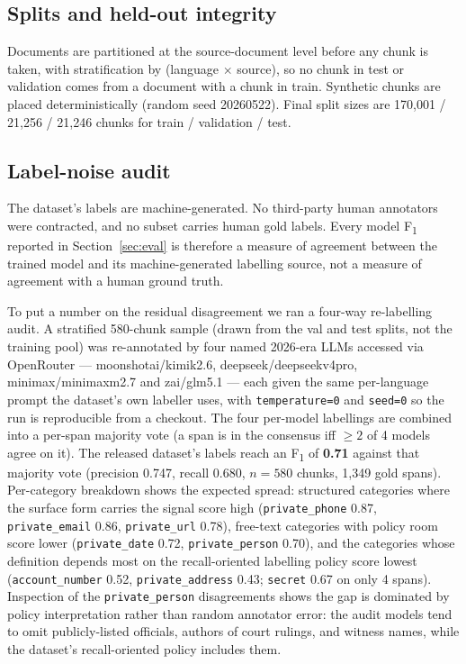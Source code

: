 \documentclass[sigconf,nonacm]{acmart}
\newcommand*{\Bhy}{\discretionary{-}{}{-}}%
\begin{document}
\subsection{Splits and held-out integrity}

Documents are partitioned at the source-document level before any
chunk is taken, with stratification by (language $\times$ source), so
no chunk in test or validation comes from a document with a chunk
in train. Synthetic chunks are placed deterministically (random seed
20260522). Final split sizes are 170{,}001 / 21{,}256 / 21{,}246
chunks for train / validation / test.

\subsection{Label-noise audit}
\label{sec:labelnoise}

The dataset's labels are machine-generated. No third-party human
annotators were contracted, and no subset carries human gold labels.
Every model F\textsubscript{1} reported in Section~\ref{sec:eval} is
therefore a measure of agreement between the trained model and its
machine-generated labelling source, not a measure of agreement with
a human ground truth.

To put a number on the residual disagreement we ran a four-way
re-labelling audit. A stratified 580-chunk sample (drawn from the
val and test splits, not the training pool) was re-annotated by
four named 2026-era LLMs accessed via OpenRouter ---
\textsf{moonshotai/kimi\Bhy k2.6}, \textsf{deepseek/deepseek\Bhy v4\Bhy pro},
\textsf{minimax/minimax\Bhy m2.7} and \textsf{z\Bhy ai/glm\Bhy 5.1} ---
each given the same per-language prompt the dataset's own labeller
uses, with \texttt{temperature=0} and \texttt{seed=0} so the run is
reproducible from a checkout. The four per-model labellings are
combined into a per-span majority vote (a span is in the consensus
iff ${\geq}2$ of 4 models agree on it). The released dataset's
labels reach an F\textsubscript{1} of \textbf{0.71} against that
majority vote (precision 0.747, recall 0.680, $n=580$ chunks,
1{,}349 gold spans). Per-category breakdown shows the expected
spread: structured categories where the surface form carries the
signal score high (\texttt{private\_phone} 0.87,
\texttt{private\_email} 0.86, \texttt{private\_url} 0.78),
free-text categories with policy room score lower
(\texttt{private\_date} 0.72, \texttt{private\_person} 0.70),
and the categories whose definition depends most on the
recall-oriented labelling policy score lowest
(\texttt{account\_number} 0.52, \texttt{private\_address} 0.43;
\texttt{secret} 0.67 on only 4 spans). Inspection of the
\texttt{private\_person} disagreements shows the gap is dominated
by policy interpretation rather than random annotator error: the
audit models tend to omit publicly-listed officials, authors of
court rulings, and witness names, while the dataset's
recall-oriented policy includes them.
\end{document}
